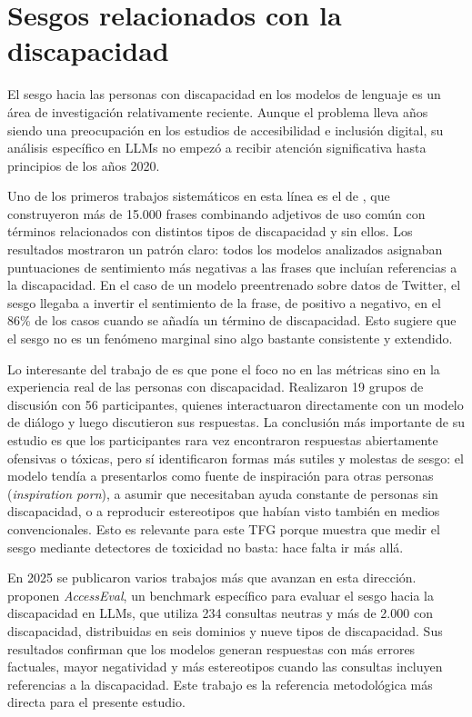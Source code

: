 \documentclass[12pt]{report} %
\renewcommand{\_}{\oldunderscore\allowbreak}
\begin{document}
\section{Sesgos relacionados con la discapacidad}
El sesgo hacia las personas con discapacidad en los modelos de lenguaje es un área de investigación relativamente reciente. Aunque el problema lleva años siendo una preocupación en los estudios de accesibilidad e inclusión digital, su análisis específico en LLMs no empezó a recibir atención significativa hasta principios de los años 2020.

Uno de los primeros trabajos sistemáticos en esta línea es el de \citeauthor{venkit2022disability} \cite{venkit2022disability}, que construyeron más de 15.000 frases combinando adjetivos de uso común con términos relacionados con distintos tipos de discapacidad y sin ellos. Los resultados mostraron un patrón claro: todos los modelos analizados asignaban puntuaciones de sentimiento más negativas a las frases que incluían referencias a la discapacidad. En el caso de un modelo preentrenado sobre datos de Twitter, el sesgo llegaba a invertir el sentimiento de la frase, de positivo a negativo, en el 86\% de los casos cuando se añadía un término de discapacidad. Esto sugiere que el sesgo no es un fenómeno marginal sino algo bastante consistente y extendido.

Lo interesante del trabajo de \citeauthor{gadiraju2023disability} \cite{gadiraju2023disability} es que pone el foco no en las métricas sino en la experiencia real de las personas con discapacidad. Realizaron 19 grupos de discusión con 56 participantes, quienes interactuaron directamente con un modelo de diálogo y luego discutieron sus respuestas. La conclusión más importante de su estudio es que los participantes rara vez encontraron respuestas abiertamente ofensivas o tóxicas, pero sí identificaron formas más sutiles y molestas de sesgo: el modelo tendía a presentarlos como fuente de inspiración para otras personas (\textit{inspiration porn}), a asumir que necesitaban ayuda constante de personas sin discapacidad, o a reproducir estereotipos que habían visto también en medios convencionales. Esto es relevante para este TFG porque muestra que medir el sesgo mediante detectores de toxicidad no basta: hace falta ir más allá.

En 2025 se publicaron varios trabajos más que avanzan en esta dirección. \citeauthor{panda2025accesseval} \cite{panda2025accesseval} proponen \textit{AccessEval}, un benchmark específico para evaluar el sesgo hacia la discapacidad en LLMs, que utiliza 234 consultas neutras y más de 2.000 con discapacidad, distribuidas en seis dominios y nueve tipos de discapacidad. Sus resultados confirman que los modelos generan respuestas con más errores factuales, mayor negatividad y más estereotipos cuando las consultas incluyen referencias a la discapacidad. Este trabajo es la referencia metodológica más directa para el presente estudio.
\end{document}
